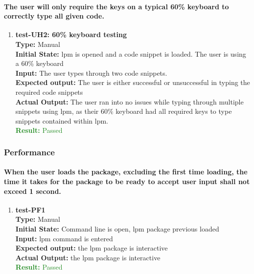 \documentclass[12pt, titlepage]{article}
\begin{document}
\paragraph{The user will only require the keys on a typical 60\% keyboard to correctly type all given code.}
\begin{enumerate}
    \item{\textbf{test-UH2: 60\% keyboard testing}\\}
    \textbf{Type:} Manual\\
    \textbf{Initial State:}  lpm is opened and a code snippet is loaded. The user is using a 60\% keyboard\\
    \textbf{Input:} The user types through two code snippets. \\
    \textbf{Expected output: }  The user is either successful or unsuccessful in typing the required code snippets\\
    \textbf{Actual Output:} The user ran into no issues while typing through multiple snippets using lpm, as their 60\% keyboard had all required keys to type snippets contained within lpm. \\
    \textcolor{ForestGreen}{\textbf{Result:} Passed}
\end{enumerate}

\subsubsection{Performance}
\paragraph{When the user loads the package, excluding the first time loading, the time it takes for the package to be ready to accept user input shall not exceed 1 second.}
\begin{enumerate}
    \item{\textbf{test-PF1}\\}
    \textbf{Type:} Manual\\
    \textbf{Initial State: } Command line is open, lpm package previous loaded\\
    \textbf{Input:} lpm command is entered\\
    \textbf{Expected output: } the lpm package is interactive \\
    \textbf{Actual Output:} the lpm package is interactive \\
    \textcolor{ForestGreen}{\textbf{Result:} Passed}
\end{enumerate}
\end{document}
